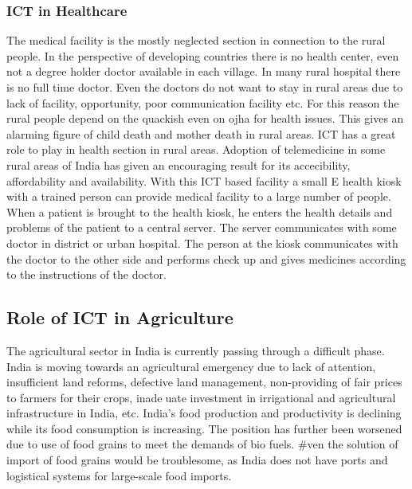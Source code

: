 \documentclass[12pt]{homework}
\begin{document}
\subsubsection{ ICT in Healthcare}
The medical facility is the mostly neglected section in connection to the rural people. In the perspective of developing countries there is no health center, even not a degree holder doctor available in each village. In many rural hospital there is no full time doctor. Even the doctors do not want to stay in rural areas due to lack of facility, opportunity, poor communication facility etc. For this reason the rural people depend on the quackish even on ojha for health issues. This gives an alarming figure of child death and mother death in rural areas. ICT has a great role to play in health section in rural areas. Adoption of telemedicine in some rural areas of India has given an encouraging result for its accecibility, affordability and availability. With this ICT based facility a small E health kiosk with a trained person can provide medical facility to a large number of people. When a patient is brought to the health kiosk, he enters the health details and problems of the patient to a central server. The server communicates with some doctor in district or urban hospital. The person at the kiosk communicates with the doctor to the other side and performs check up and gives medicines according to the instructions of the doctor.\\



\subsection{Role of ICT in Agriculture}


The agricultural sector in India is currently passing through a difficult phase. India is moving towards an agricultural emergency due to lack of attention, insufficient land reforms, defective land management, non-providing of fair prices to farmers for their crops, inadeuate investment in irrigational and agricultural infrastructure in India, etc. India's food production and productivity is declining while its food consumption is increasing. The position has further been worsened due to use of food grains to meet the demands of bio fuels. #ven the solution of import of food grains would be troublesome, as India does not have ports and logistical systems for large-scale food imports.\\
\end{document}
